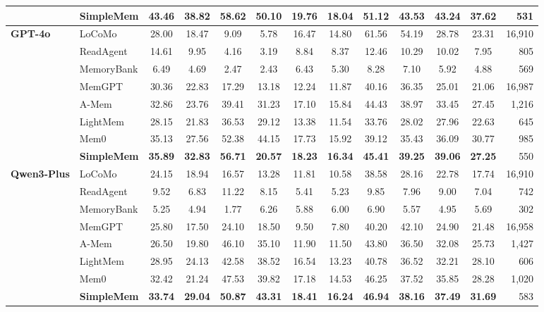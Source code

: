 \documentclass{article}
\newcommand{\ours}{SimpleMem}
\theoremstyle{plain}
\theoremstyle{definition}
\theoremstyle{remark}
\begin{document}
\begin{table}[t]
{\begin{tabular}{l|l|cc|cc|cc|cc|cc|r}
 \rowcolor{gray!9} & \textbf{\ours{}} & \textbf{43.46} & \textbf{38.82} & \textbf{58.62} & \textbf{50.10} & \textbf{19.76} & \textbf{18.04} & \textbf{51.12} & \textbf{43.53} & \textbf{43.24}  & \textbf{37.62} & 531 \\
\midrule

\multirow{8}{*}{\textbf{GPT-4o}} 
 & LoCoMo & 28.00 & 18.47 & 9.09 & 5.78 & 16.47 & 14.80 & 61.56 & 54.19 & 28.78 & 23.31 & 16,910 \\
 & ReadAgent & 14.61 & 9.95 & 4.16 & 3.19 & 8.84 & 8.37 & 12.46 & 10.29 & 10.02 & 7.95 & 805 \\
 & MemoryBank & 6.49 & 4.69 & 2.47 & 2.43 & 6.43 & 5.30 & 8.28 & 7.10 & 5.92 & 4.88 & 569 \\
 & MemGPT & 30.36  & 22.83  & 17.29  & 13.18  & 12.24  & 11.87  & 40.16  & 36.35  & 25.01  & 21.06  & 16,987 \\
 & A-Mem & 32.86  & 23.76  & 39.41  & 31.23  & 17.10  & 15.84  & 44.43  & 38.97  & 33.45  & 27.45 & 1,216 \\
 & LightMem & 28.15 & 21.83 & 36.53 & 29.12 & 13.38 & 11.54 & 33.76  & 28.02  & 27.96  & 22.63 & 645 \\
 & Mem0 & 35.13 & 27.56 & 52.38 & 44.15 & 17.73 & 15.92 & 39.12 & 35.43 & 36.09  & 30.77 & 985 \\
 \rowcolor{gray!9} & \textbf{\ours{}} & \textbf{35.89} & \textbf{32.83} & \textbf{56.71} & \textbf{20.57} & \textbf{18.23} & \textbf{16.34} & \textbf{45.41} & \textbf{39.25} & \textbf{39.06}  & \textbf{27.25}  & 550 \\
\midrule

\multirow{8}{*}{\textbf{Qwen3-Plus}} 
 & LoCoMo & 24.15 & 18.94 & 16.57 & 13.28 & 11.81 & 10.58 & 38.58 & 28.16 & 22.78 & 17.74 & 16,910 \\
 & ReadAgent & 9.52 & 6.83 & 11.22 & 8.15 & 5.41 & 5.23 & 9.85 & 7.96 & 9.00 & 7.04 & 742 \\
 & MemoryBank & 5.25 & 4.94 & 1.77 & 6.26 & 5.88 & 6.00 & 6.90 & 5.57 & 4.95 & 5.69 & 302 \\
 & MemGPT & 25.80 & 17.50 & 24.10 & 18.50 & 9.50 & 7.80 & 40.20 & 42.10 & 24.90 & 21.48 & 16,958 \\
 & A-Mem & 26.50 & 19.80 & 46.10 & 35.10 & 11.90 & 11.50 & 43.80 & 36.50 & 32.08 & 25.73 & 1,427 \\
 & LightMem & 28.95 & 24.13 & 42.58 & 38.52 & 16.54 & 13.23 & 40.78 & 36.52 & 32.21 & 28.10 & 606 \\
 & Mem0 & 32.42 & 21.24 & 47.53 & 39.82 & 17.18 & 14.53 & 46.25 & 37.52 & 35.85  & 28.28 & 1,020 \\
 \rowcolor{gray!9} & \textbf{\ours{}} & \textbf{33.74} & \textbf{29.04} & \textbf{50.87} & \textbf{43.31} & \textbf{18.41} & \textbf{16.24} & \textbf{46.94} & \textbf{38.16} & \textbf{37.49}  & \textbf{31.69} & 583 \\
\bottomrule
\end{tabular}
}
\vspace{-0.5em}
\end{table}
\end{document}
